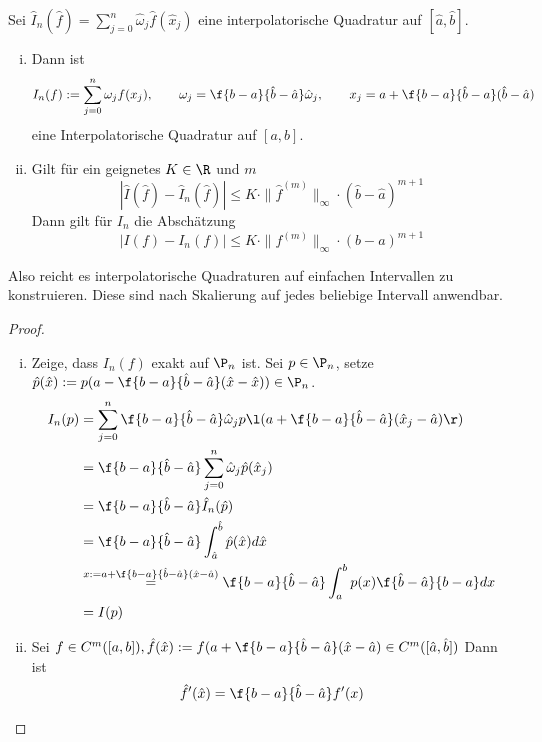 \documentclass[11pt]{scrartcl}
\begin{document}
\begin{st}[Koordinatentransformation]
	\label{2.8}
	Sei $\hat I_n(\hat f) = \sum_{j=0}^n \hat \omega_j \hat f(\hat x_j)$ eine interpolatorische Quadratur auf $[\hat a, \hat b]$.
	\begin{enumerate}[i)]
		\item
			Dann ist
			\[
				I_n(f) := \sum_{j=0}^n \omega_j f(x_j), \qquad \omega_j = \f{b-a}{\hat b - \hat a}\hat \omega_j, \qquad x_j =a + \f{b-a}{\hat b -a}(\hat b - \hat a)
			\]
			eine Interpolatorische Quadratur auf $[a,b]$.
		\item
			Gilt für ein geignetes $K\in \R$ und $m$
			\[
				|\hat I(\hat f) - \hat I_n(\hat f) | \le K \cdot \|\hat f^{(m)}\|_\infty \cdot (\hat b - \hat a)^{m+1}
			\]
			Dann gilt für $I_n$ die Abschätzung
			\[
				|I(f) - I_n(f)| \le K \cdot \|f^{(m)}\|_\infty \cdot (b-a)^{m+1}
			\]
	\end{enumerate}
	\begin{note}
		Also reicht es interpolatorische Quadraturen auf einfachen Intervallen zu konstruieren.
		Diese sind nach Skalierung auf jedes beliebige Intervall anwendbar.
	\end{note}
	\begin{proof}
		\begin{enumerate}[i)]
			\item
				Zeige, dass $I_n(f)$ exakt auf $\P_n$ ist.
				Sei $p\in \P_n$, setze $\hat p(\hat x) := p(a- \f {b-a}{\hat b- \hat a}(\hat x- \hat x)) \in \P_n$.
				\begin{align*}
					I_n(p) 
					&= \sum_{j=0}^{n} \f {b-a}{\hat b - \hat a} \hat \omega_j p\l(a + \f {b-a}{\hat b - \hat a}(\hat x_j - \hat a)\r) \\
					&=\f {b-a}{\hat b - \hat a}\sum_{j=0}^n \hat \omega_j \hat p(\hat x_j) \\
					&= \f {b-a}{\hat b - \hat a}\hat I_n(\hat p) \\
					&= \f {b-a}{\hat b - \hat a}\int_{\hat a}^{\hat b}\hat p(\hat x) d\hat x \\
					&\stackrel{x:= a+ \f{b-a}{\hat b - \hat a}(\hat x - \hat a)} = \f {b-a}{\hat b - \hat a} \int_a^b p(x) \f {\hat b - \hat a}{b-a} dx \\
					&= I(p)
				\end{align*}
			\item
				Sei $f\in C^m([a,b]), \hat f(\hat x) := f(a + \f {b-a}{\hat b - \hat a}(\hat x - \hat a) \in C^m([\hat a,\hat b])$
				Dann ist
				\begin{align*}
					\hat f'(\hat x) &= \f {b-a}{\hat b - \hat a}f'(x) \\

\end{align*}
\end{enumerate}
\end{proof}
\end{st}
\end{document}
